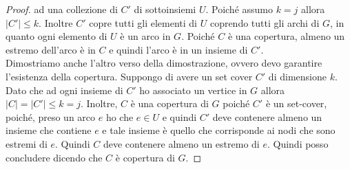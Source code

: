 \documentclass[a4paper,12pt, oneside]{book}
\begin{document}
\begin{proof}
  ad una collezione di $C'$ di sottoinsiemi $U$. Poiché assumo $k=j$ allora
  $|C'|\leq k$. Inoltre $C'$ copre tutti gli elementi di $U$ coprendo tutti gli
  archi di $G$, in quanto ogni elemento di $U$ è un arco in $G$. Poiché $C$ è
  una copertura, almeno un estremo dell’arco è in $C$  e quindi l’arco è in un
  insieme di $C'$.\\
  Dimostriamo anche l'altro verso della dimostrazione, ovvero devo garantire
  l'esistenza della copertura. Suppongo di avere un set cover $C'$ di dimensione
  $k$. Dato che ad ogni insieme di $C'$ ho associato un vertice in $G$ allora
  $|C|=|C'|\leq k=j$. Inoltre, $C$ è una copertura di $G$ poiché $C'$ è un
  set-cover, poiché, preso un arco $e$ ho che $e\in U$ e quindi $C'$ deve
  contenere almeno un insieme che contiene $e$ e tale insieme è quello che
  corrisponde ai nodi che sono estremi di $e$. Quindi $C$ deve contenere almeno
  un estremo di $e$. Quindi posso concludere dicendo che $C$ è copertura di $G$.
\end{proof}
\end{document}
